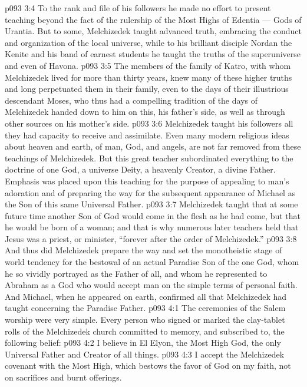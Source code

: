 \vs p093 3:4 To the rank and file of his followers he made no effort to present teaching beyond the fact of the rulership of the Most Highs of Edentia --- Gods of Urantia. But to some, Melchizedek taught advanced truth, embracing the conduct and organization of the local universe, while to his brilliant disciple Nordan the Kenite and his band of earnest students he taught the truths of the superuniverse and even of Havona.
\vs p093 3:5 The members of the family of Katro, with whom Melchizedek lived for more than thirty years, knew many of these higher truths and long perpetuated them in their family, even to the days of their illustrious descendant Moses, who thus had a compelling tradition of the days of Melchizedek handed down to him on this, his father’s side, as well as through other sources on his mother’s side.
\vs p093 3:6 Melchizedek taught his followers all they had capacity to receive and assimilate. Even many modern religious ideas about heaven and earth, of man, God, and angels, are not far removed from these teachings of Melchizedek. But this great teacher subordinated everything to the doctrine of one God, a universe Deity, a heavenly Creator, a divine Father. Emphasis was placed upon this teaching for the purpose of appealing to man’s adoration and of preparing the way for the subsequent appearance of Michael as the Son of this same Universal Father.
\vs p093 3:7 Melchizedek taught that at some future time another Son of God would come in the flesh as he had come, but that he would be born of a woman; and that is why numerous later teachers held that Jesus was a priest, or minister, “forever after the order of Melchizedek.”
\vs p093 3:8 And thus did Melchizedek prepare the way and set the monotheistic stage of world tendency for the bestowal of an actual Paradise Son of the one God, whom he so vividly portrayed as the Father of all, and whom he represented to Abraham as a God who would accept man on the simple terms of personal faith. And Michael, when he appeared on earth, confirmed all that Melchizedek had taught concerning the Paradise Father.
\vs p093 4:1 The ceremonies of the Salem worship were very simple. Every person who signed or marked the clay\hyp{}tablet rolls of the Melchizedek church committed to memory, and subscribed to, the following belief:
\vs p093 4:2 \bibnobreakspace I believe in El Elyon, the Most High God, the only Universal Father and Creator of all things.
\vs p093 4:3 \bibnobreakspace I accept the Melchizedek covenant with the Most High, which bestows the favor of God on my faith, not on sacrifices and burnt offerings.
